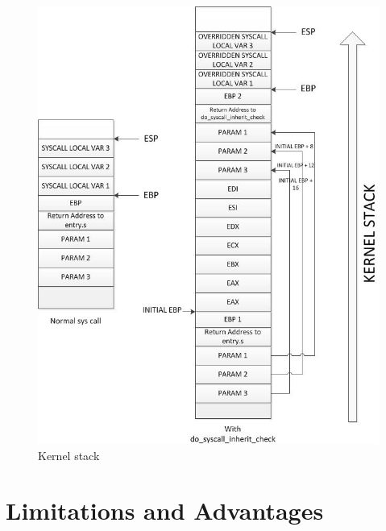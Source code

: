 \documentclass[11pt]{article}
\begin{document}
\begin{figure}[hb2]
  \centering
  \includegraphics[width=5in]{kernel.jpg}
  \caption{Kernel stack}
   \label{fig:kernelstack}
\end{figure}

\section{Limitations and Advantages}
\end{document}
